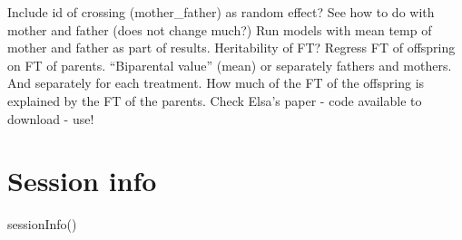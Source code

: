 \documentclass[
]{article}
\newenvironment{Shaded}{\begin{snugshade}}{\end{snugshade}}
\newcommand{\FunctionTok}[1]{\textcolor[rgb]{0.00,0.00,0.00}{#1}}
\newcommand{\NormalTok}[1]{#1}
\begin{document}
Include id of crossing (mother\_father) as random effect? See how to do
with mother and father (does not change much?) Run models with mean temp
of mother and father as part of results. Heritability of FT? Regress FT
of offspring on FT of parents. ``Biparental value'' (mean) or separately
fathers and mothers. And separately for each treatment. How much of the
FT of the offspring is explained by the FT of the parents. Check Elsa's
paper - code available to download - use!

\hypertarget{session-info}{%
\section{Session info}\label{session-info}}

\begin{Shaded}
\begin{Highlighting}[]
\FunctionTok{sessionInfo}\NormalTok{()}
\end{Highlighting}
\end{Shaded}
\end{document}

